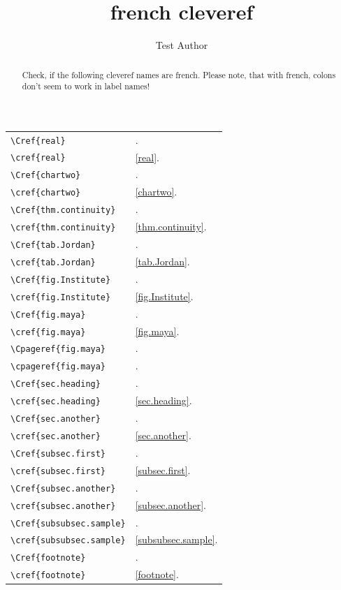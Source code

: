 \documentclass{snapshotmfo}
\author{Test Author}
\title{french cleveref}
\begin{document}

\begin{abstract}
Check, if the following cleveref names are french. Please note, that with french, colons don't seem to work in label names!
\end{abstract}

\noindent\begin{longtable}{@{}l@{\quad yields\quad}l@{}}
	\verb+\Cref{real}+             &\Cref{real}.\\
	\verb+\cref{real}+             &\cref{real}.\\[1ex]
	\verb+\Cref{chartwo}+           &\Cref{chartwo}.\\
	\verb+\cref{chartwo}+           &\cref{chartwo}.\\[1ex]
	\verb+\Cref{thm.continuity}+   &\Cref{thm.continuity}.\\
	\verb+\cref{thm.continuity}+   &\cref{thm.continuity}.\\[1ex]
	\verb+\Cref{tab.Jordan}+       &\Cref{tab.Jordan}.\\
	\verb+\cref{tab.Jordan}+       &\cref{tab.Jordan}.\\[1ex]
	\verb+\Cref{fig.Institute}+    &\Cref{fig.Institute}.\\
	\verb+\cref{fig.Institute}+    &\cref{fig.Institute}.\\[1ex]
	\verb+\Cref{fig.maya}+         &\Cref{fig.maya}.\\
	\verb+\cref{fig.maya}+         &\cref{fig.maya}.\\[1ex]
	\verb+\Cpageref{fig.maya}+     &\Cpageref{fig.maya}.\\
	\verb+\cpageref{fig.maya}+     &\cpageref{fig.maya}.\\[1ex]
	\verb+\Cref{sec.heading}+      &\Cref{sec.heading}.\\
	\verb+\cref{sec.heading}+      &\cref{sec.heading}.\\[1ex]
	\verb+\Cref{sec.another}+      &\Cref{sec.another}.\\
	\verb+\cref{sec.another}+      &\cref{sec.another}.\\[1ex]
	\verb+\Cref{subsec.first}+     &\Cref{subsec.first}.\\
	\verb+\cref{subsec.first}+     &\cref{subsec.first}.\\[1ex]
	\pagebreak
	\verb+\Cref{subsec.another}+   &\Cref{subsec.another}.\\
	\verb+\cref{subsec.another}+   &\cref{subsec.another}.\\[1ex]
	\verb+\Cref{subsubsec.sample}+ &\Cref{subsubsec.sample}.\\
	\verb+\cref{subsubsec.sample}+ &\cref{subsubsec.sample}.\\[1ex]
	\verb+\Cref{footnote}+         &\Cref{footnote}.\\
	\verb+\cref{footnote}+         &\cref{footnote}.\\
\end{longtable}
\end{document}
